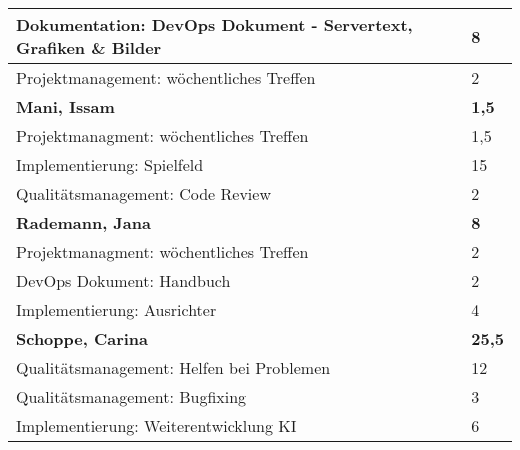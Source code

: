 \documentclass[a4paper,11pt]{scrartcl}
\begin{document}
\begin{longtable}{| p{13.8cm} | C{2.4cm} |}
	Dokumentation: DevOps Dokument - Servertext, Grafiken \& Bilder
	&
	8
	\\
	\hline

	Projektmanagement: wöchentliches Treffen
	&
  2
	\\
	\hline
	\hline


	\textbf{Mani, Issam} & \textbf{1,5}\\ %
	\hline

  Projektmanagment: wöchentliches Treffen
	&
  1,5
	\\
	\hline

  Implementierung: Spielfeld
	&
  15
	\\
	\hline

  Qualitätsmanagement: Code Review
	&
  2
	\\
	\hline
	\hline


	\textbf{Rademann, Jana} & \textbf{8}\\ %
	\hline

  Projektmanagment: wöchentliches Treffen
	&
  2
	\\
	\hline

  DevOps Dokument: Handbuch
	&
  2
	\\
	\hline

  Implementierung: Ausrichter
	&
  4
	\\
	\hline
	\hline


	\textbf{Schoppe, Carina} & \textbf{25,5}\\ %
	\hline

  Qualitätsmanagement: Helfen bei Problemen
	&
  12
	\\
	\hline

  Qualitätsmanagement: Bugfixing
	&
  3
	\\
	\hline

  Implementierung: Weiterentwicklung KI
	&
  6
	\\
	\hline


\end{longtable}
\end{document}
